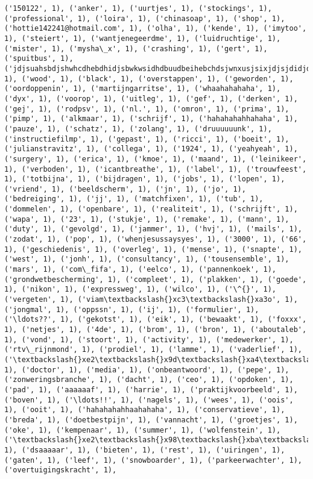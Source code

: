 \documentclass{article}
\begin{document}
\begin{Verbatim}[commandchars=\\\{\}]
('150122', 1), ('anker', 1), ('uurtjes', 1), ('stockings', 1), ('professional', 1), ('loira', 1), ('chinasoap', 1), ('shop', 1), ('hottie142241@hotmail.com', 1), ('olha', 1), ('kende', 1), ('imytoo', 1), ('steiert', 1), ('wantjenegeerdme', 1), ('luidruchtige', 1), ('mister', 1), ('mysha\_x', 1), ('crashing', 1), ('gert', 1), ('spuitbus', 1), ('jdjsuahsbdjshwhcdhebdhidjsbwkwsidhdbuudbeihebchdsjwnxusjsixjdjsjdidjdk', 1), ('wood', 1), ('black', 1), ('overstappen', 1), ('geworden', 1), ('oordoppenin', 1), ('martijngarritse', 1), ('whaahahahaha', 1), ('dyx', 1), ('voorop', 1), ('uitleg', 1), ('gef', 1), ('derken', 1), ('gej', 1), ('rodpsv', 1), ('nl.', 1), ('omron', 1), ('prima', 1), ('pimp', 1), ('alkmaar', 1), ('schrijf', 1), ('hahahahahhahaha', 1), ('pauze', 1), ('schatz', 1), ('zolang', 1), ('druuuuuunk', 1), ('instructiefilmp', 1), ('gepast', 1), ('ricci', 1), ('boeit', 1), ('julianstravitz', 1), ('collega', 1), ('1924', 1), ('yeahyeah', 1), ('surgery', 1), ('erica', 1), ('kmoe', 1), ('maand', 1), ('leinikeer', 1), ('verboden', 1), ('icantbreathe', 1), ('label', 1), ('trouwfeest', 1), ('totbijna', 1), ('bijdragen', 1), ('jobs', 1), ('lopen', 1), ('vriend', 1), ('beeldscherm', 1), ('jn', 1), ('jo', 1), ('bedreiging', 1), ('jj', 1), ('matchfixen', 1), ('tub', 1), ('dommelen', 1), ('openbare', 1), ('realiteit', 1), ('schrijft', 1), ('wapa', 1), ('23', 1), ('stukje', 1), ('remake', 1), ('mann', 1), ('duty', 1), ('gevolgd', 1), ('jammer', 1), ('hvj', 1), ('mails', 1), ('zodat', 1), ('pop', 1), ('whenjesussaysyes', 1), ('3000', 1), ('66', 1), ('geschiedenis', 1), ('overleg', 1), ('mense', 1), ('snapte', 1), ('west', 1), ('jonh', 1), ('consultancy', 1), ('tousensemble', 1), ('mars', 1), ('com\_fifa', 1), ('eelco', 1), ('pannenkoek', 1), ('grondwetbescherming', 1), ('compleet', 1), ('plakken', 1), ('goede', 1), ('nikon', 1), ('expressweg', 1), ('wilco', 1), ('\^{}', 1), ('vergeten', 1), ('viam\textbackslash{}xc3\textbackslash{}xa3o', 1), ('jongmal', 1), ('oppssn', 1), ('ij', 1), ('formulier', 1), ('\ldots??', 1), ('gekotst', 1), ('eik', 1), ('bewaakt', 1), ('foxxx', 1), ('netjes', 1), ('4de', 1), ('brom', 1), ('bron', 1), ('aboutaleb', 1), ('vond', 1), ('stoort', 1), ('activity', 1), ('medewerker', 1), ('rtv\_rijnmond', 1), ('prodiel', 1), ('lamme', 1), ('vaderlief', 1), ('\textbackslash{}xe2\textbackslash{}x9d\textbackslash{}xa4\textbackslash{}xef\textbackslash{}xb8\textbackslash{}x8fgirls\textbackslash{}xe2\textbackslash{}x9d\textbackslash{}xa4\textbackslash{}xef\textbackslash{}xb8\textbackslash{}x8f', 1), ('doctor', 1), ('media', 1), ('onbeantwoord', 1), ('pepe', 1), ('zonweringsbranche', 1), ('dacht', 1), ('ceo', 1), ('opdoken', 1), ('pad', 1), ('aaaaaaf', 1), ('harrie', 1), ('praktijkvoorbeeld', 1), ('boven', 1), ('\ldots!!', 1), ('nagels', 1), ('wees', 1), ('oois', 1), ('ooit', 1), ('hahahahahhaahahaha', 1), ('conservatieve', 1), ('breda', 1), ('doetbestpijn', 1), ('vannacht', 1), ('groetjes', 1), ('oke', 1), ('kempenaar', 1), ('summer', 1), ('wolfenstein', 1), ('\textbackslash{}xe2\textbackslash{}x98\textbackslash{}xba\textbackslash{}xef\textbackslash{}xb8\textbackslash{}x8f', 1), ('dsaaaaar', 1), ('bieten', 1), ('rest', 1), ('uiringen', 1), ('gaten', 1), ('leef', 1), ('snowboarder', 1), ('parkeerwachter', 1), ('overtuigingskracht', 1), 
\end{Verbatim}
\end{document}
